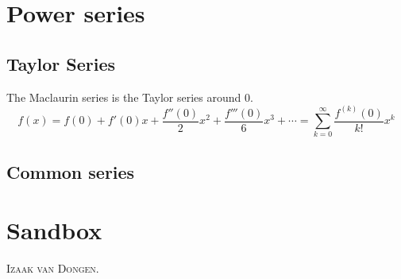 \documentclass[fleqn,a4paper,11pt]{article}
\begin{document}
    \section{Power series} %

    \subsection{Taylor Series}

    The Maclaurin series is the Taylor series around \(0\).
    \begin{equation}
    f(x) = f(0) + f'(0) x + \frac{f''(0)} 2 x^2 + \frac{f'''(0)}{6}x^3 +\dotsb
      = \sum_{k=0}^\infty \frac{f^{(k)}(0)}{k!}x^k
    \end{equation}

    \subsection{Common series}

    \section{Sandbox}

    \lettrine{\color{RoyalBlue4}I}{zaak van Dongen}. \lipsum[1]
\end{document}
